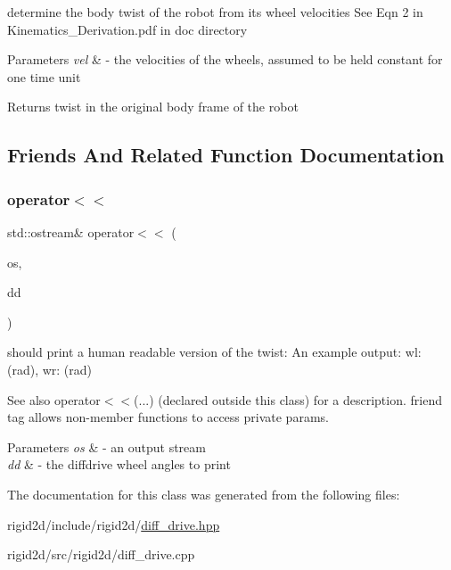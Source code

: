 determine the body twist of the robot from its wheel velocities See Eqn 2 in Kinematics\+\_\+\+Derivation.\+pdf in doc directory 


\begin{DoxyParams}{Parameters}
{\em vel} & -\/ the velocities of the wheels, assumed to be held constant for one time unit \\
\hline
\end{DoxyParams}
\begin{DoxyReturn}{Returns}
twist in the original body frame of the robot 
\end{DoxyReturn}


\subsection{Friends And Related Function Documentation}
\mbox{\label{classrigid2d_1_1DiffDrive_a550d9cd3c290f20ebcbc118c1dd79897}} 
\subsubsection{\texorpdfstring{operator$<$$<$}{operator<<}}
{\footnotesize\ttfamily std\+::ostream\& operator$<$$<$ (\begin{DoxyParamCaption}\item[{std\+::ostream \&}]{os,  }\item[{const \hyperlink{classrigid2d_1_1DiffDrive}{Diff\+Drive} \&}]{dd }\end{DoxyParamCaption})\hspace{0.3cm}{\ttfamily [friend]}}



should print a human readable version of the twist\+: An example output\+: wl\+: (rad), wr\+: (rad) 

\begin{DoxySeeAlso}{See also}
operator$<$$<$(...) (declared outside this class) for a description. friend tag allows non-\/member functions to access private params.
\end{DoxySeeAlso}

\begin{DoxyParams}{Parameters}
{\em os} & -\/ an output stream \\
\hline
{\em dd} & -\/ the diffdrive wheel angles to print \\
\hline
\end{DoxyParams}


The documentation for this class was generated from the following files\+:\begin{DoxyCompactItemize}
\item 
rigid2d/include/rigid2d/\hyperlink{diff__drive_8hpp}{diff\+\_\+drive.\+hpp}\item 
rigid2d/src/rigid2d/diff\+\_\+drive.\+cpp\end{DoxyCompactItemize}
